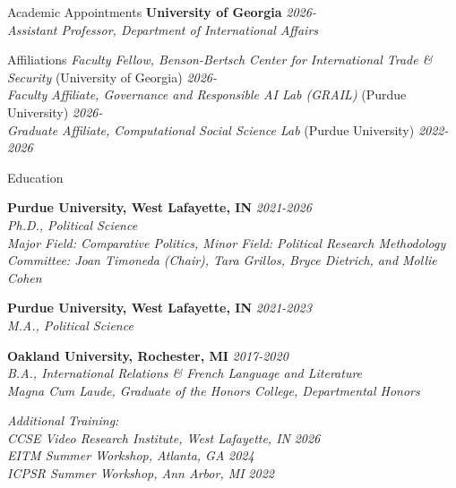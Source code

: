 \documentclass{resume} %
\begin{document}

\begin{rSection}{Academic Appointments}
{\bf University of Georgia} \hfill {\em 2026-} 
\\ {\it Assistant Professor, Department of International Affairs}
\end{rSection}

\begin{rSection}{Affiliations}
{\it Faculty Fellow, Benson-Bertsch Center for International Trade \& Security} (University of Georgia) \hfill {\em 2026-} 
\\ {\it Faculty Affiliate, Governance and Responsible AI Lab (GRAIL)} (Purdue University) \hfill {\em 2026-} 
\\ {\it Graduate Affiliate, Computational Social Science Lab} (Purdue University) \hfill {\em 2022-2026} 

\end{rSection}


\begin{rSection}{Education}

{\bf Purdue University, West Lafayette, IN} \hfill {\em 2021-2026} 
\\ {\it Ph.D., Political Science
\\ Major Field: Comparative Politics, Minor Field: Political Research Methodology
\\ Committee: Joan Timoneda (Chair), Tara Grillos, Bryce Dietrich, and Mollie Cohen}

{\bf Purdue University, West Lafayette, IN} \hfill {\em 2021-2023} 
\\ {\it M.A., Political Science}

{\bf Oakland University, Rochester, MI} \hfill {\em 2017-2020} 
\\ {\it B.A., International Relations \& French Language and Literature \hfill 
\\Magna Cum Laude, Graduate of the Honors College, Departmental Honors}

{\it Additional Training:}
\\{\it CCSE Video Research Institute, West Lafayette, IN}
\hfill {\em 2026} 
\\{\it EITM Summer Workshop, Atlanta, GA}
\hfill {\em 2024} 
\\{\it ICPSR Summer Workshop, Ann Arbor, MI}
\hfill {\em 2022} 

\end{rSection}
\end{document}
